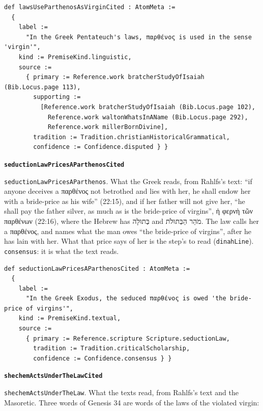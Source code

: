 \documentclass[11pt]{article}
\begin{document}
{\small\begin{verbatim}
def lawsUseParthenosAsVirginCited : AtomMeta :=
  {
    label :=
      "In the Greek Pentateuch's laws, παρθένος is used in the sense 'virgin'",
    kind := PremiseKind.linguistic,
    source :=
      { primary := Reference.work bratcherStudyOfIsaiah (Bib.Locus.page 113),
        supporting :=
          [Reference.work bratcherStudyOfIsaiah (Bib.Locus.page 102),
            Reference.work waltonWhatsInAName (Bib.Locus.page 292),
            Reference.work millerBornDivine],
        tradition := Tradition.christianHistoricalGrammatical,
        confidence := Confidence.disputed } }
\end{verbatim}}
\par\medskip\noindent\textbf{\texttt{seduction\allowbreak{}Law\allowbreak{}Prices\allowbreak{}AParthenos\allowbreak{}Cited}}\par\nobreak\noindent
\texttt{seduction\allowbreak{}Law\allowbreak{}Prices\allowbreak{}AParthenos}. What the Greek reads, from Rahlfs’s text: “if anyone deceives a παρθένος not betrothed and lies with her, he shall endow her with a bride-price as his wife” (22:15), and if her father will not give her, “he shall pay the father silver, as much as is the bride-price of virgins”, ἡ φερνὴ τῶν παρθένων (22:16), where the Hebrew has בְּתוּלָה and מֹהַר הַבְּתוּלֹת. The law calls her a παρθένος, and names what the man owes “the bride-price of virgins”, after he has lain with her. What that price says of her is the step’s to read (\texttt{dinah\allowbreak{}Line}). \texttt{consensus}: it is what the text reads.

{\small\begin{verbatim}
def seductionLawPricesAParthenosCited : AtomMeta :=
  {
    label :=
      "In the Greek Exodus, the seduced παρθένος is owed 'the bride-price of virgins'",
    kind := PremiseKind.textual,
    source :=
      { primary := Reference.scripture Scripture.seductionLaw,
        tradition := Tradition.criticalScholarship,
        confidence := Confidence.consensus } }
\end{verbatim}}
\par\medskip\noindent\textbf{\texttt{shechem\allowbreak{}Acts\allowbreak{}Under\allowbreak{}The\allowbreak{}Law\allowbreak{}Cited}}\par\nobreak\noindent
\texttt{shechem\allowbreak{}Acts\allowbreak{}Under\allowbreak{}The\allowbreak{}Law}. What the texts read, from Rahlfs’s text and the Masoretic. Three words of Genesis 34 are words of the laws of the violated virgin:
\end{document}
